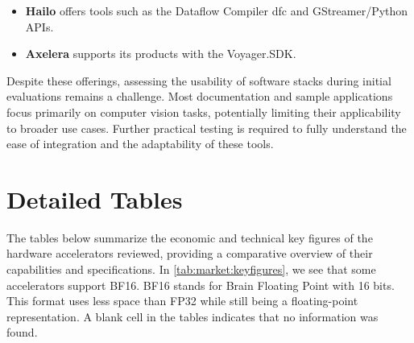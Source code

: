 \begin{itemize}
    \item \textbf{Hailo} offers tools such as the Dataflow Compiler \acrshort{dfc} and GStreamer/Python APIs.
    \item \textbf{Axelera} supports its products with the Voyager.SDK.
\end{itemize}

Despite these offerings, assessing the usability of software stacks during initial evaluations remains a challenge.
Most documentation and sample applications focus primarily on computer vision tasks, potentially limiting their applicability to broader use cases.
Further practical testing is required to fully understand the ease of integration and the adaptability of these tools.


\section{Detailed Tables}
The tables below summarize the economic and technical key figures of the hardware accelerators reviewed, providing a comparative overview of their capabilities and specifications.
In \cref{tab:market:keyfigures}, we see that some accelerators support BF16.
BF16 stands for Brain Floating Point with 16 bits. This format uses less space than FP32 while still being a floating-point representation.
A blank cell in the tables indicates that no information was found.


